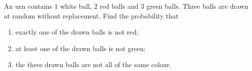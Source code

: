 An urn contains $1$ white ball, $2$ red balls and $3$ green balls. Three balls are drawn at random without replacement. Find the probability that
\begin{enumerate}
\item[(a)] exactly one of the drawn balls is not red;
\item[(b)] at least one of the drawn balls is not green;
\item[(c)] the three drawn balls are not all of the same colour.
\end{enumerate}
